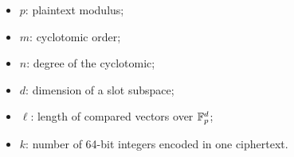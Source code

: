 \begin{itemize}
  \item $p$: plaintext modulus;
  \item $m$: cyclotomic order;
  \item $n$: degree of the cyclotomic;
  \item $d$: dimension of a slot subspace;
  \item $\ell$: length of compared vectors over $\mathbb{F}_p^d$;
  \item $k$: number of 64-bit integers encoded in one ciphertext.
\end{itemize}
